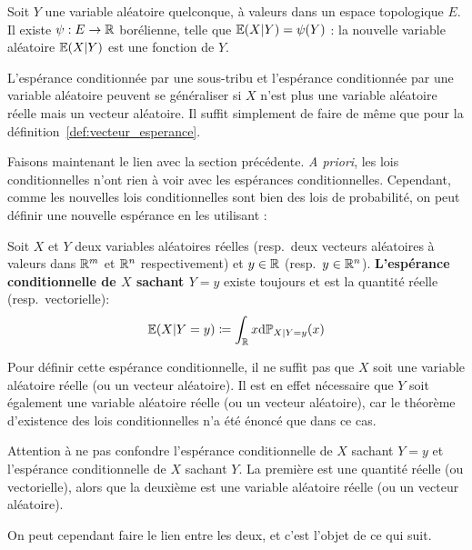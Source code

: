 \documentclass[../integ-proba.tex]{subfiles}
\begin{document}
    \begin{prop}
        Soit $Y$ une variable aléatoire quelconque, à valeurs dans un espace topologique $E$.
        Il existe $\psi : E \rightarrow \mathbb{R}$ borélienne, telle que $\mathbb{E}(X | Y) = \psi(Y)$ : la nouvelle variable aléatoire $\mathbb{E}(X | Y)$ est une fonction de $Y$.
    \end{prop}

    \begin{rem}
        L'espérance conditionnée par une sous-tribu et l'espérance conditionnée par une variable aléatoire peuvent se généraliser si $X$ n'est plus une variable aléatoire réelle mais un vecteur aléatoire.
        Il suffit simplement de faire de même que pour la définition~\ref{def:vecteur_esperance}.
    \end{rem}

    Faisons maintenant le lien avec la section précédente.
    \textit{A priori}, les lois conditionnelles n'ont rien à voir avec les espérances conditionnelles.
    Cependant, comme les nouvelles lois conditionnelles sont bien des lois de probabilité, on peut définir une nouvelle espérance en les utilisant :

    \begin{defi}
        Soit $X$ et $Y$ deux variables aléatoires réelles (resp.\ deux vecteurs aléatoires à valeurs dans $\mathbb{R}^m$ et $\mathbb{R}^n$ respectivement) et $y \in \mathbb{R}$ (resp.\ $y \in \mathbb{R}^n$).
        \textbf{L'espérance conditionnelle de $X$ sachant $Y = y$} existe toujours et est la quantité réelle (resp.\ vectorielle):
        \begin{displaymath}
            \mathbb{E}(X | Y = y) \coloneqq \int_{\mathbb{R}} x \textnormal{d} \mathbb{P}_{X | Y=y}(x)
        \end{displaymath}
    \end{defi}

    \begin{rem}
        Pour définir cette espérance conditionnelle, il ne suffit pas que $X$ soit une variable aléatoire réelle (ou un vecteur aléatoire).
        Il est en effet nécessaire que $Y$ soit également une variable aléatoire réelle (ou un vecteur aléatoire), car le théorème d'existence des lois conditionnelles n'a été énoncé que dans ce cas.
    \end{rem}

    \begin{rem}
        Attention à ne pas confondre l'espérance conditionnelle de $X$ sachant $Y = y$ et l'espérance conditionnelle de $X$ sachant $Y$.
        La première est une quantité réelle (ou vectorielle), alors que la deuxième est une variable aléatoire réelle (ou un vecteur aléatoire).

        On peut cependant faire le lien entre les deux, et c'est l'objet de ce qui suit.
    \end{rem}
\end{document}
